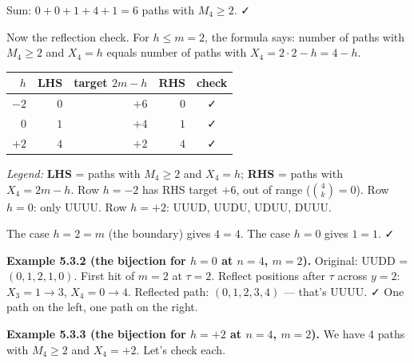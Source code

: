 \documentclass[
  10pt,
  twoside]{book}
\newcounter{none} %
\begin{document}
Sum: \(0 + 0 + 1 + 4 + 1 = 6\) paths with \(M_4 \ge 2\). ✓

Now the reflection check. For \(h \le m = 2\), the formula says: number
of paths with \(M_4 \ge 2\) and \(X_4 = h\) equals number of paths with
\(X_4 = 2 \cdot 2 - h = 4 - h\).

{\def\LTcaptype{none} %
\begin{table}[H]
\centering
\begin{tabular}{|r|r|r|r|c|}
\toprule
\(h\) & LHS & target \(2m-h\) & RHS & check \\
\midrule



\(-2\) & \(0\) & \(+6\) & \(0\) & ✓ \\
\(0\) & \(1\) & \(+4\) & \(1\) & ✓ \\
\(+2\) & \(4\) & \(+2\) & \(4\) & ✓ \\
\bottomrule
\end{tabular}
\end{table}
}

\emph{Legend:} \textbf{LHS} = paths with \(M_4 \ge 2\) and \(X_4 = h\);
\textbf{RHS} = paths with \(X_4 = 2m - h\). Row \(h = -2\) has RHS
target \(+6\), out of range (\(\binom{4}{k} = 0\)). Row \(h = 0\): only
UUUU. Row \(h = +2\): UUUD, UUDU, UDUU, DUUU.

The case \(h = 2 = m\) (the boundary) gives \(4 = 4\). The case
\(h = 0\) gives \(1 = 1\). ✓

\textbf{Example 5.3.2 (the bijection for \(h = 0\) at \(n = 4\),
\(m = 2\)).} Original: UUDD = \((0, 1, 2, 1, 0)\). First hit of
\(m = 2\) at \(\tau = 2\). Reflect positions after \(\tau\) across
\(y = 2\): \(X_3 = 1 \to 3\), \(X_4 = 0 \to 4\). Reflected path:
\((0, 1, 2, 3, 4)\) --- that's UUUU. ✓ One path on the left, one path on
the right.

\textbf{Example 5.3.3 (the bijection for \(h = +2\) at \(n = 4\),
\(m = 2\)).} We have 4 paths with \(M_4 \ge 2\) and \(X_4 = +2\). Let's
check each.
\end{document}
